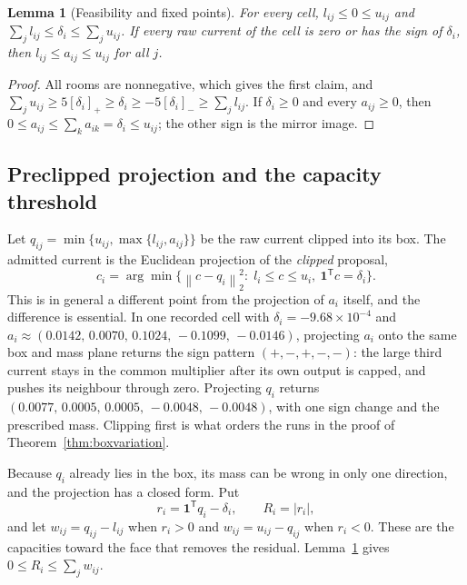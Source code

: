 \documentclass[journal]{IEEEtran}
\newtheorem{lemma}{Lemma}
\newcommand{\norm}[1]{\left\lVert#1\right\rVert}
\begin{document}
\begin{lemma}[Feasibility and fixed points]
\label{lem:boxfeasible}
For every cell, \(l_{ij}\le0\le u_{ij}\) and
\(\sum_jl_{ij}\le\delta_i\le\sum_ju_{ij}\). If every raw current of the
cell is zero or has the sign of \(\delta_i\), then
\(l_{ij}\le a_{ij}\le u_{ij}\) for all \(j\).
\end{lemma}

\begin{proof}
All rooms are nonnegative, which gives the first claim, and
\(\sum_ju_{ij}\ge5[\delta_i]_+\ge\delta_i\ge-5[\delta_i]_-\ge\sum_jl_{ij}\).
If \(\delta_i\ge0\) and every \(a_{ij}\ge0\), then
\(0\le a_{ij}\le\sum_ka_{ik}=\delta_i\le u_{ij}\); the other sign is the
mirror image.
\end{proof}

\subsection{Preclipped projection and the capacity threshold}

Let \(q_{ij}=\min\{u_{ij},\max\{l_{ij},a_{ij}\}\}\) be the raw current
clipped into its box. The admitted current is the Euclidean projection of
the \emph{clipped} proposal,
\begin{equation}
 c_i=\arg\min\bigl\{\norm{c-q_i}_2^2:\;
 l_i\le c\le u_i,\ \bm1^{\mathsf T}c=\delta_i\bigr\}.
 \label{eq:boxprojection}
\end{equation}
This is in general a different point from the projection of \(a_i\)
itself, and the difference is essential. In one recorded cell with
\(\delta_i=-9.68\times10^{-4}\) and
\(a_i\approx(0.0142,\,0.0070,\,0.1024,\,-0.1099,\,-0.0146)\), projecting
\(a_i\) onto the same box and mass plane returns the sign pattern
\((+,-,+,-,-)\): the large third current stays in the common multiplier
after its own output is capped, and pushes its neighbour through zero.
Projecting \(q_i\) returns
\((0.0077,\,0.0005,\,0.0005,\,-0.0048,\,-0.0048)\), with one sign change
and the prescribed mass. Clipping first is what orders the runs in the
proof of Theorem~\ref{thm:boxvariation}.

Because \(q_i\) already lies in the box, its mass can be wrong in only one
direction, and the projection has a closed form. Put
\begin{equation}
 r_i=\bm1^{\mathsf T}q_i-\delta_i,\qquad R_i=|r_i|,
 \label{eq:boxresidual}
\end{equation}
and let \(w_{ij}=q_{ij}-l_{ij}\) when \(r_i>0\) and
\(w_{ij}=u_{ij}-q_{ij}\) when \(r_i<0\). These are the capacities toward
the face that removes the residual. Lemma~\ref{lem:boxfeasible} gives
\(0\le R_i\le\sum_jw_{ij}\).
\end{document}
